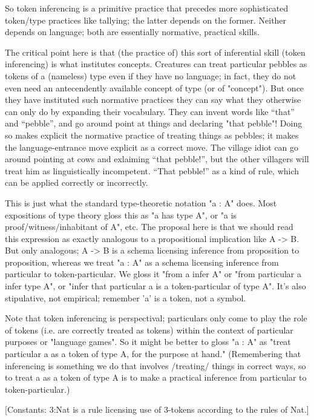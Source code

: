 \documentclass{article}
\begin{document}
So token inferencing is a primitive practice that precedes more
sophisticated token/type practices like tallying; the latter depends
on the former.  Neither depends on language; both are essentially
normative, practical skills.

The critical point here is that (the practice of) this sort of
inferential skill (token inferencing) is what institutes concepts.
Creatures can treat particular pebbles as tokens of a (nameless) type
even if they have no language; in fact, they do not even need an
antecendently available concept of type (or of "concept").  But once
they have instituted such normative practices they can say what they
otherwise can only do by expanding their vocabulary.  They can invent
words like ``that'' and ``pebble'', and go around point at things and
declaring "that pebble"!  Doing so makes explicit the normative
practice of treating things as pebbles; it makes the language-entrance
move explicit as a correct move.  The village idiot can go around
pointing at cows and exlaiming ``that pebble!'', but the other
villagers will treat him as linguistically incompetent.  ``That
pebble!'' as a kind of rule, which can be applied correctly or
incorrectly.

This is just what the standard type-theoretic notation "a : A" does.
Most expositions of type theory gloss this as "a has type A", or "a is
proof/witness/inhabitant of A", etc.  The proposal here is that we
should read this expression as exactly analogous to a propositional
implication like A -> B.  But only analogous; A -> B is a schema
licensing inference from proposition to proposition, whereas we treat
"a : A" as a schema licensing inference from particular to
token-particular.  We gloss it "from a infer A" or "from particular a
infer type A", or "infer that particular a is a token-particular of
type A".  It's also stipulative, not empirical; remember 'a' is a
token, not a symbol.

Note that token inferencing is perspectival; particulars only come to
play the role of tokens (i.e. are correctly treated as tokens) within
the context of particular purposes or "language games".  So it might
be better to gloss "a : A" as "treat particular a as a token of type
A, for the purpose at hand."  (Remembering that inferencing is
something we do that involves /treating/ things in correct ways, so to
treat a as a token of type A is to make a practical inference from
particular to token-particular.)

[Constants: 3:Nat is a rule licensing use of 3-tokens according to the
  rules of Nat.]
\end{document}
